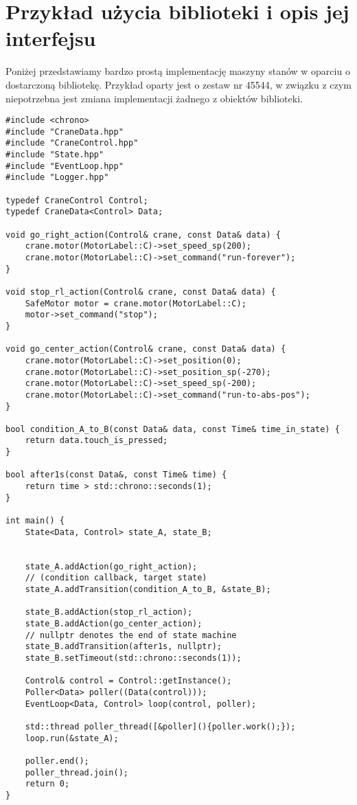 \documentclass{article}
\begin{document}
\section{Przykład użycia biblioteki i opis jej interfejsu}\label{user_api}
Poniżej przedstawiamy bardzo prostą implementację maszyny stanów w oparciu o dostarczoną
bibliotekę. Przykład oparty jest o zestaw nr 45544, w związku z czym
niepotrzebna jest zmiana implementacji żadnego z obiektów biblioteki.
\begin{lstlisting}
#include <chrono>
#include "CraneData.hpp"
#include "CraneControl.hpp"
#include "State.hpp"
#include "EventLoop.hpp"
#include "Logger.hpp"

typedef CraneControl Control;
typedef CraneData<Control> Data;

void go_right_action(Control& crane, const Data& data) {
    crane.motor(MotorLabel::C)->set_speed_sp(200);
    crane.motor(MotorLabel::C)->set_command("run-forever");
}

void stop_rl_action(Control& crane, const Data& data) {
    SafeMotor motor = crane.motor(MotorLabel::C);
    motor->set_command("stop");
}

void go_center_action(Control& crane, const Data& data) {
    crane.motor(MotorLabel::C)->set_position(0);
    crane.motor(MotorLabel::C)->set_position_sp(-270);
    crane.motor(MotorLabel::C)->set_speed_sp(-200);
    crane.motor(MotorLabel::C)->set_command("run-to-abs-pos");
}

bool condition_A_to_B(const Data& data, const Time& time_in_state) {
    return data.touch_is_pressed;
}

bool after1s(const Data&, const Time& time) {
    return time > std::chrono::seconds(1);
}

int main() {
    State<Data, Control> state_A, state_B;


    state_A.addAction(go_right_action);
    // (condition callback, target state)
    state_A.addTransition(condition_A_to_B, &state_B);

    state_B.addAction(stop_rl_action);
    state_B.addAction(go_center_action);
    // nullptr denotes the end of state machine
    state_B.addTransition(after1s, nullptr);
    state_B.setTimeout(std::chrono::seconds(1));

    Control& control = Control::getInstance();
    Poller<Data> poller((Data(control)));
    EventLoop<Data, Control> loop(control, poller);

    std::thread poller_thread([&poller](){poller.work();});
    loop.run(&state_A);

    poller.end();
    poller_thread.join();
    return 0;
}
\end{lstlisting}
\end{document}
